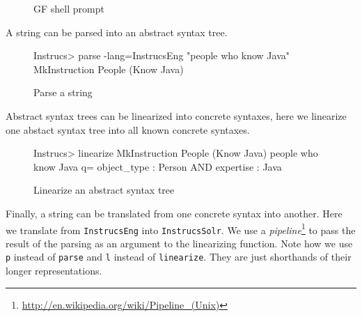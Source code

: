 \begin{figure}[H]

\caption{GF shell prompt\label{fig:gf-shell}}
\end{figure}

A string can be parsed into an abstract syntax tree.

\begin{figure}[H]
\begin{terminal}
Instrucs> parse -lang=InstrucsEng "people who know Java"
MkInstruction People (Know Java)
\end{terminal}

\caption{Parse a string\label{fig:parse-a-string}}
\end{figure}

Abstract syntax trees can be linearized into concrete syntaxes, here we linearize one abstact syntax tree into all known concrete syntaxes.

\begin{figure}[H]
\begin{terminal}
Instrucs> linearize MkInstruction People (Know Java)
people who know Java
q= object_type : Person AND expertise : Java
\end{terminal}

\caption{Linearize an abstract syntax tree\label{fig:linearization}}
\end{figure}

Finally, a string can be translated from one concrete syntax into another. Here we translate from \texttt{InstrucsEng} into \texttt{InstrucsSolr}. We use a \emph{pipeline}\footnote{\url{http://en.wikipedia.org/wiki/Pipeline_(Unix)}} to pass the result of the parsing as an argument to the linearizing function. Note how we use \texttt{p} instead of \texttt{parse} and \texttt{l} instead of \texttt{linearize}. They are just shorthands of their longer representations.


